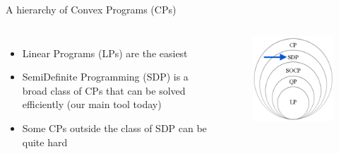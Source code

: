 \documentclass[aspectratio=169]{beamer}
\begin{document}
\begin{frame}{A hierarchy of Convex Programs (CPs)}
\begin{columns}
\begin{itemize}
\item
Linear Programs (LPs) are the easiest
\item
SemiDefinite Programming (SDP) is a broad class of CPs that can be solved efficiently (our main tool today)
\item
Some CPs outside the class of SDP can be quite hard
\end{itemize}
\begin{figure}
\includegraphics[width=\columnwidth]{figures/hierarchy.png}
\end{figure}
\end{columns}
\end{frame}
\end{document}
